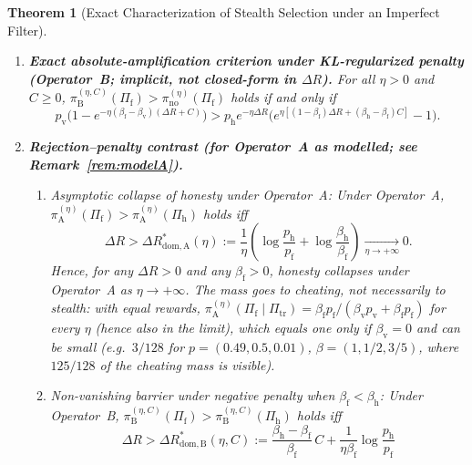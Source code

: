 \documentclass[11pt,a4paper]{article}
\newtheorem{theorem}{Theorem}
\begin{document}
\begin{theorem}[Exact Characterization of Stealth Selection under an Imperfect Filter]
\begin{enumerate}
  \item \textbf{Exact absolute-amplification criterion under KL-regularized penalty (Operator~B; implicit, not closed-form in $\Delta R$).} For all $\eta > 0$ and $C \ge 0$, $\pi_{\mathrm{B}}^{(\eta, C)}(\Pi_{\mathrm{f}}) > \pi_{\mathrm{no}}^{(\eta)}(\Pi_{\mathrm{f}})$ holds if and only if
  \begin{equation}\label{eq:ampB}
    p_{\mathrm{v}}\Big(1 - e^{-\eta(\beta_{\mathrm{f}} - \beta_{\mathrm{v}})(\Delta R + C)}\Big)
    > p_{\mathrm{h}} e^{-\eta \Delta R}\Big(e^{\eta[(1-\beta_{\mathrm{f}})\Delta R + (\beta_{\mathrm{h}} - \beta_{\mathrm{f}})C]} - 1\Big).
  \end{equation}

  \item \textbf{Rejection--penalty contrast (for Operator~A as modelled; see Remark~\ref{rem:modelA}).}
  \begin{enumerate}
    \item \emph{Asymptotic collapse of honesty under Operator~A:} Under Operator~A, $\pi_{\mathrm{A}}^{(\eta)}(\Pi_{\mathrm{f}}) > \pi_{\mathrm{A}}^{(\eta)}(\Pi_{\mathrm{h}})$ holds iff
    \begin{equation}\label{eq:domA}
      \Delta R > \Delta R_{\mathrm{dom, A}}^*(\eta)
      := \frac{1}{\eta}\left(\log\frac{p_{\mathrm{h}}}{p_{\mathrm{f}}} + \log\frac{\beta_{\mathrm{h}}}{\beta_{\mathrm{f}}}\right)
      \xrightarrow[\eta \to +\infty]{} 0.
    \end{equation}
    Hence, for any $\Delta R > 0$ and any $\beta_{\mathrm{f}} > 0$, honesty collapses under Operator~A as $\eta \to +\infty$. The mass goes to cheating, not necessarily to stealth: with equal rewards, $\pi_{\mathrm{A}}^{(\eta)}(\Pi_{\mathrm{f}} \mid \Pi_{\mathrm{tr}}) = \beta_{\mathrm{f}}p_{\mathrm{f}}/(\beta_{\mathrm{v}}p_{\mathrm{v}} + \beta_{\mathrm{f}}p_{\mathrm{f}})$ for every $\eta$ (hence also in the limit), which equals one only if $\beta_{\mathrm{v}} = 0$ and can be small (e.g.\ $3/128$ for $p = (0.49, 0.5, 0.01)$, $\beta = (1, 1/2, 3/5)$, where $125/128$ of the cheating mass is visible).
    \item \emph{Non-vanishing barrier under negative penalty when $\beta_{\mathrm{f}} < \beta_{\mathrm{h}}$:} Under Operator~B, $\pi_{\mathrm{B}}^{(\eta, C)}(\Pi_{\mathrm{f}}) > \pi_{\mathrm{B}}^{(\eta, C)}(\Pi_{\mathrm{h}})$ holds iff
    \begin{equation}\label{eq:domB}
      \Delta R > \Delta R_{\mathrm{dom, B}}^*(\eta, C)
      := \frac{\beta_{\mathrm{h}} - \beta_{\mathrm{f}}}{\beta_{\mathrm{f}}}\,C + \frac{1}{\eta \beta_{\mathrm{f}}}\log\frac{p_{\mathrm{h}}}{p_{\mathrm{f}}}

\end{equation}
\end{enumerate}
\end{enumerate}
\end{theorem}
\end{document}
